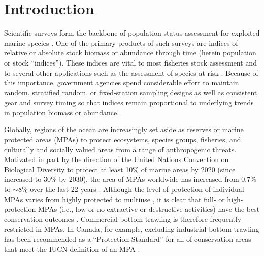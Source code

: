 \documentclass[12pt]{article}
\begin{document}
\section*{Introduction}

Scientific surveys form the backbone of population status assessment for exploited marine species \citep[e.g.,][]{doubleday1981, hilbornwalters1992, gunderson1993}. One of the primary products of such surveys are indices of relative or absolute stock biomass or abundance through time (herein population or stock ``indices''). These indices are vital to most fisheries stock assessment \citep{hilbornwalters1992} and to several other applications such as the assessment of species at risk \citep{iucn2012}. Because of this importance, government agencies spend considerable effort to maintain random, stratified random, or fixed-station sampling designs as well as consistent gear and survey timing so that indices remain proportional to underlying trends in population biomass or abundance.

Globally, regions of the ocean are increasingly set aside as reserves or marine protected areas (MPAs) to protect ecosystems, species groups, fisheries, and culturally and socially valued areas from a range of anthropogenic threats. Motivated in part by the direction of the United Nations Convention on Biological Diversity to protect at least 10\% of marine areas by 2020 (since increased to 30\% by 2030), the area of MPAs worldwide has increased from 0.7\% to $\sim$8\% over the last 22 years \citep{WDPA2022}. Although the level of protection of individual MPAs varies from highly protected to multiuse \citep{hortaecosta2016, grorud-colvert2021}, it is clear that full- or high-protection MPAs (i.e., low or no extractive or destructive activities) have the best conservation outcomes \citep[e.g.,][]{lester2008, sciberras2015, edgar2014, zupan2018}. Commercial bottom trawling is therefore frequently restricted in MPAs. In Canada, for example, excluding industrial bottom trawling has been recommended as a ``Protection Standard'' for all of conservation areas that meet the IUCN definition of an MPA \citep{dfo2022standards}.
\end{document}
